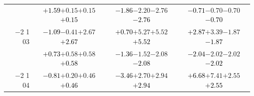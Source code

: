 \documentclass[compress]{beamer}
\begin{document}
\begin{frame}
\begin{tabular}{r | c | c | c}
          & \textcolor{black}{$+1.59$}\hspace{0.1 cm}$+0.15$\hspace{0.1 cm}$+0.15$\hspace{0.1 cm}\textcolor{black}{$+0.15$} & \textcolor{black}{$-1.86$}\hspace{0.1 cm}$-2.20$\hspace{0.1 cm}$-2.76$\hspace{0.1 cm}\textcolor{black}{$-2.76$} & \textcolor{black}{$-0.71$}\hspace{0.1 cm}$-0.70$\hspace{0.1 cm}$-0.70$\hspace{0.1 cm}\textcolor{black}{$-0.70$} \\
$-$2 1 03 & \textcolor{black}{$-1.09$}\hspace{0.1 cm}$-0.41$\hspace{0.1 cm}$+2.67$\hspace{0.1 cm}\textcolor{black}{$+2.67$} & \textcolor{black}{$+0.70$}\hspace{0.1 cm}$+5.27$\hspace{0.1 cm}$+5.52$\hspace{0.1 cm}\textcolor{black}{$+5.52$} & \textcolor{black}{$+2.87$}\hspace{0.1 cm}$+3.39$\hspace{0.1 cm}$-1.87$\hspace{0.1 cm}\textcolor{black}{$-1.87$} \\
          & \textcolor{black}{$+0.73$}\hspace{0.1 cm}$+0.58$\hspace{0.1 cm}$+0.58$\hspace{0.1 cm}\textcolor{black}{$+0.58$} & \textcolor{black}{$-1.36$}\hspace{0.1 cm}$-1.52$\hspace{0.1 cm}$-2.08$\hspace{0.1 cm}\textcolor{black}{$-2.08$} & \textcolor{black}{$-2.04$}\hspace{0.1 cm}$-2.02$\hspace{0.1 cm}$-2.02$\hspace{0.1 cm}\textcolor{black}{$-2.02$} \\
$-$2 1 04 & \textcolor{black}{$-0.81$}\hspace{0.1 cm}$+0.20$\hspace{0.1 cm}$+0.46$\hspace{0.1 cm}\textcolor{black}{$+0.46$} & \textcolor{black}{$-3.46$}\hspace{0.1 cm}$+2.70$\hspace{0.1 cm}$+2.94$\hspace{0.1 cm}\textcolor{black}{$+2.94$} & \textcolor{black}{$+6.68$}\hspace{0.1 cm}$+7.41$\hspace{0.1 cm}$+2.55$\hspace{0.1 cm}\textcolor{black}{$+2.55$} \\

\end{tabular}
\end{frame}
\end{document}
